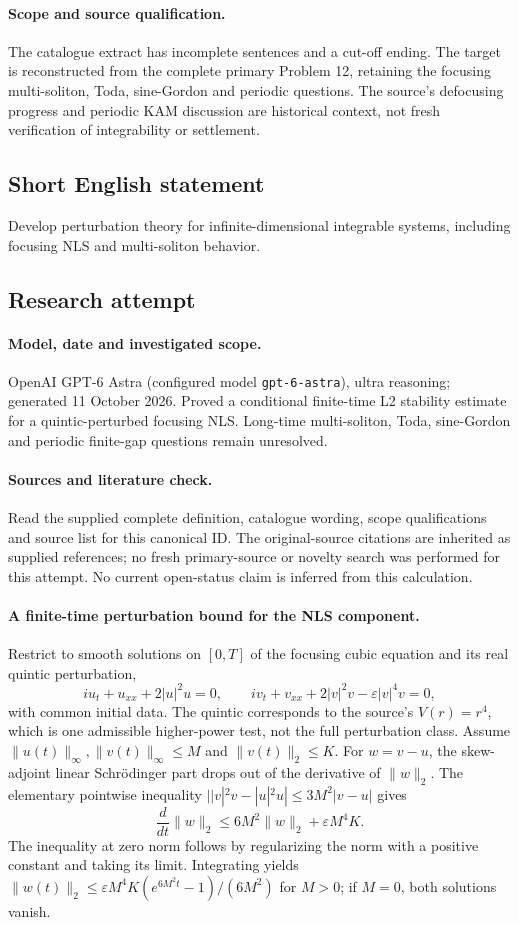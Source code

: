 \documentclass[11pt]{article}
\begin{document}
\paragraph{Scope and source qualification.}The catalogue extract has incomplete sentences and a cut-off ending. The target is reconstructed from the complete primary Problem 12, retaining the focusing multi-soliton, Toda, sine-Gordon and periodic questions. The source’s defocusing progress and periodic KAM discussion are historical context, not fresh verification of integrability or settlement.
\subsection{Short English statement}
Develop perturbation theory for infinite-dimensional integrable systems, including focusing NLS and multi-soliton behavior.
\subsection{Research attempt}
\paragraph{Model, date and investigated scope.}
OpenAI GPT-6 Astra (configured model \texttt{gpt-6-astra}), ultra reasoning; generated 11 October 2026. Proved a conditional finite-time L2 stability estimate for a quintic-perturbed focusing NLS. Long-time multi-soliton, Toda, sine-Gordon and periodic finite-gap questions remain unresolved.

\paragraph{Sources and literature check.}
Read the supplied complete definition, catalogue wording, scope qualifications and source list for this canonical ID. The original-source citations are inherited as supplied references; no fresh primary-source or novelty search was performed for this attempt. No current open-status claim is inferred from this calculation.

\paragraph{A finite-time perturbation bound for the NLS component.}Restrict to smooth solutions on \([0,T]\) of the focusing cubic equation and its real quintic perturbation,
\[iu_t+u_{xx}+2|u|^2u=0,\qquad iv_t+v_{xx}+2|v|^2v-\varepsilon|v|^4v=0,
\]
with common initial data. The quintic corresponds to the source's \(V(r)=r^4\), which is one admissible higher-power test, not the full perturbation class. Assume \(\|u(t)\|_\infty,\|v(t)\|_\infty\le M\) and \(\|v(t)\|_2\le K\). For \(w=v-u\), the skew-adjoint linear Schrödinger part drops out of the derivative of \(\|w\|_2\). The elementary pointwise inequality \(||v|^2v-|u|^2u|\le3M^2|v-u|\) gives
\[\frac{d}{dt}\|w\|_2\le6M^2\|w\|_2+\varepsilon M^4K.
\]
The inequality at zero norm follows by regularizing the norm with a positive constant and taking its limit. Integrating yields \(\|w(t)\|_2\le\varepsilon M^4K(e^{6M^2t}-1)/(6M^2)\) for \(M>0\); if \(M=0\), both solutions vanish.
\end{document}
